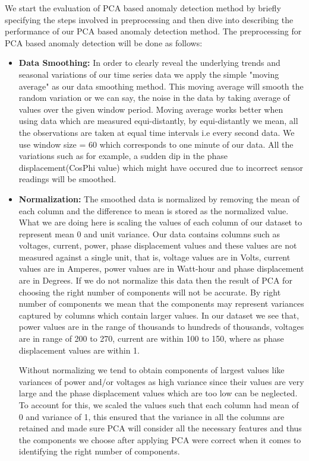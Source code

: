 We start the evaluation of PCA based anomaly detection method by briefly specifying the steps involved in preprocessing and then dive into describing the performance of our PCA based anomaly detection method. The preprocessing for PCA based anomaly detection will be done as follows:
\begin{itemize}
\item\textbf{Data Smoothing:} In order to clearly reveal the underlying trends and seasonal variations of our time series data we apply the simple "moving average" as our data smoothing method. This moving average will smooth the random variation or we can say, the noise in the data by taking average of values over the given window period. Moving average works better when using data which are measured equi-distantly, by equi-distantly we mean, all the observations are taken at equal time intervals i.e every second data. We use window size = 60 which corresponds to one minute of our data. All the variations such as for example, a sudden dip in the phase displacement(CosPhi value) which might have occured due to incorrect sensor readings will be smoothed.

\item\textbf{Normalization:} The smoothed data is normalized by removing the mean of each column and the difference to mean is stored as the normalized value. What we are doing here is scaling the values of each column of our dataset to represent mean 0 and unit variance. Our data contains columns such as voltages, current, power, phase displacement values and these values are not measured against a single unit, that is, voltage values are in Volts, current values are in Amperes, power values are in Watt-hour and phase displacement are in Degrees. If we do not normalize this data then the result of PCA for choosing the right number of components will not be accurate. By right number of components we mean that the components may represent variances captured by columns which contain larger values. In our dataset we see that, power values are in the range of thousands to hundreds of thousands, voltages are in range of 200 to 270, current are within 100 to 150, where as phase displacement values are within 1. 

Without normalizing we tend to obtain components of largest values like variances of  power and/or voltages  as high variance since their values are very large and the phase displacement values which are too low can be neglected. To account for this, we scaled the values such that each column had mean of 0 and variance of 1, this ensured that the variance in all the columns are retained and made sure PCA will consider all the necessary features and thus the components we choose after applying PCA were correct when it comes to identifying the right number of components.
\end{itemize}

